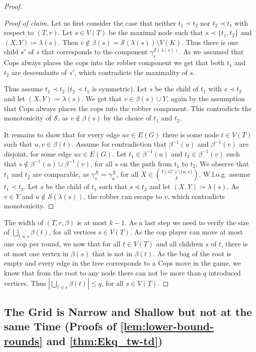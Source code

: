 \documentclass[10pt,a4paper]{article}
\newenvironment{claimproof}{\begin{proof}[Proof of claim]}{\end{proof}}
\begin{document}
\begin{proof}
\begin{claimproof}
		Let us first consider the case that neither $t_1\prec t_2$ nor $t_2\prec t_1$ with respect to $(T,r)$.
		Let $s\in V(T)$ be the maximal node such that $s\prec \{t_1,t_2\}$ and $(X,Y)\coloneqq\lambda(s)$.
		Then $v\not\in\beta(s)=\mathcal{S}(\lambda(s))\setminus V(K)$.
		Thus there is one child $s'$ of $s$ that corresponds to the component $\gamma_v^{\mathcal{S}(\lambda(s))}$.
		As we assumed that Cops always places the cops into the robber component we get that both $t_1$ and $t_2$ are descendants of $s'$, which contradicts the maximality of $s$.
		
		Thus assume $t_1 \prec t_2$ ($t_2\prec t_1$ is symmetric).
		Let $s$ be the child of $t_1$ with $s\prec t_2$ and let $(X,Y)\coloneqq\lambda(s)$.
		We get that $v\in\beta(s)\cup Y$, again by the assumption that Cops always places the cops into the robber component.
		This contradicts the monotonicity of $\mathcal{S}$, as $v\notin \beta(s)$ by the choice of $t_1$ and $t_2$.
		
		It remains to show that for every edge $uv\in E(G)$ there is some node $t\in V(T)$ such that $u,v\in\beta(t)$.
		Assume for contradiction that $\beta^{-1}(u)$ and $\beta^{-1}(v)$ are disjoint, for some edge $uv\in E(G)$.
		Let $t_1\in \beta^{-1}(u)$ and $t_2\in \beta^{-1}(v)$ such that $s\notin\beta^{-1}(u)\cup\beta^{-1}(v)$, for all $s$ on the path from $t_1$ to $t_2$.
		We observe that $t_1$ and $t_2$ are comparable, as $\gamma_{v}^X=\gamma_u^X$, for all $X\in\binom{V(G')\setminus\{u,v\}}{k}$.
		W.l.o.g. assume $t_1\prec t_2$.
		Let $s$ be the child of $t_1$ such that $s\preceq t_2$ and let $(X,Y)\coloneqq\lambda(s)$.
		As $v\in Y$ and $u\notin\mathcal{S}(\lambda(s))$, the robber can escape to $v$, which contradicts monotonicity.
	\end{claimproof}
	
	The width of $(T,r,\beta)$ is at most $k-1$.
	As a last step we need to verify the size of $\bigcup_{t\preceq s}\beta(t)$, for all vertices $s\in V(T)$.
	As the cop player can move at most one cop per round, we now that for all $t\in V(T)$ and all children $s$ of $t$, there is at most one vertex in $\beta(s)$ that is not in $\beta(t)$.
	As the bag of the root is empty and every edge in the tree corresponds to a Cops move in the game, we know that from the root to any node there can not be more than $q$ introduced vertices.
	Thus $|\bigcup_{t\preceq s}\beta(t)|\leq q$, for all $s\in V(T)$.
\end{proof}



\subsection{The Grid is Narrow and Shallow but not at the same Time (Proofs of \cref{lem:lower-bound-rounds} and \cref{thm:Ekq_tw-td})}
\label{app:rounds}
\end{document}
